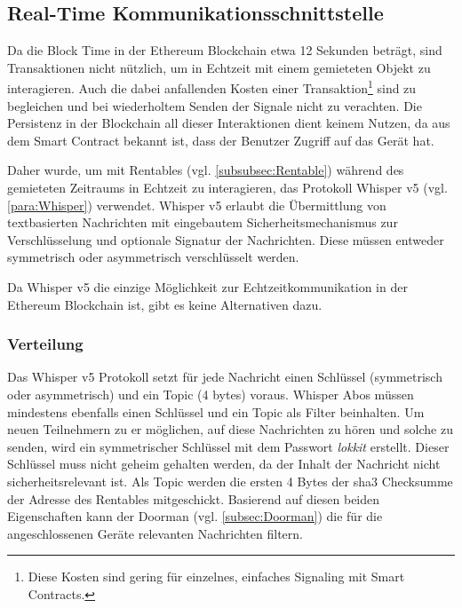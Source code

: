 \subsection{Real-Time Kommunikationsschnittstelle}
\label{subsec:Real_Time_Kommunikationsschnittstelle}
Da die Block Time in der Ethereum Blockchain etwa 12 Sekunden beträgt, sind Transaktionen nicht nützlich, um in Echtzeit mit einem gemieteten Objekt zu interagieren. Auch die dabei anfallenden Kosten einer Transaktion\footnote{Diese Kosten sind gering für einzelnes, einfaches Signaling mit Smart Contracts.} sind zu begleichen und bei wiederholtem Senden der Signale nicht zu verachten. Die Persistenz in der Blockchain all dieser Interaktionen dient keinem Nutzen, da aus dem Smart Contract bekannt ist, dass der Benutzer Zugriff auf das Gerät hat. \cite{blog.ethereum.org/block-time}

Daher wurde, um mit Rentables (vgl. \ref{subsubsec:Rentable}) während des gemieteten Zeitraums in Echtzeit zu interagieren, das Protokoll Whisper v5 (vgl. \ref{para:Whisper}) verwendet. Whisper v5 erlaubt die Übermittlung von textbasierten Nachrichten mit eingebautem Sicherheitsmechanismus zur Verschlüsselung und optionale Signatur der Nachrichten. Diese müssen entweder symmetrisch oder asymmetrisch verschlüsselt werden.\cite[Wiki/Whisper Usage]{go-ethereum}

Da Whisper v5 die einzige Möglichkeit zur Echtzeitkommunikation in der Ethereum Blockchain ist, gibt es keine Alternativen dazu.

\subsubsection{Verteilung}
\label{subsubsec:Verteilung}
Das Whisper v5 Protokoll setzt für jede Nachricht einen Schlüssel (symmetrisch oder asymmetrisch) und ein Topic (4 bytes) voraus. Whisper Abos müssen mindestens ebenfalls einen Schlüssel und ein Topic als Filter beinhalten. Um neuen Teilnehmern zu er möglichen, auf diese Nachrichten zu hören und solche zu senden, wird ein symmetrischer Schlüssel mit dem Passwort \emph{lokkit} erstellt. Dieser Schlüssel muss nicht geheim gehalten werden, da der Inhalt der Nachricht nicht sicherheitsrelevant ist. Als Topic werden die ersten 4 Bytes der sha3 Checksumme der Adresse des Rentables mitgeschickt. Basierend auf diesen beiden Eigenschaften kann der Doorman (vgl. \ref{subsec:Doorman}) die für die angeschlossenen Geräte relevanten Nachrichten filtern.\cite[Wiki/Whisper Overview]{go-ethereum}

